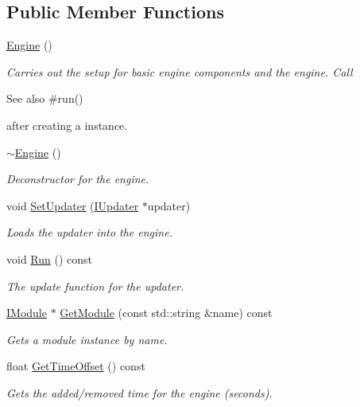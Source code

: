 \subsection*{Public Member Functions}
\begin{DoxyCompactItemize}
\item 
\hyperlink{class_flounder_1_1_engine_abd2648b60415ffaaae1152fa65e10937}{Engine} ()
\begin{DoxyCompactList}\small\item\em Carries out the setup for basic engine components and the engine. Call \begin{DoxySeeAlso}{See also}
\#run()


\end{DoxySeeAlso}
after creating a instance. \end{DoxyCompactList}\item 
\hyperlink{class_flounder_1_1_engine_abb8f83d5ed5345f6cb262a0ac5a3e24c}{$\sim$\+Engine} ()
\begin{DoxyCompactList}\small\item\em Deconstructor for the engine. \end{DoxyCompactList}\item 
void \hyperlink{class_flounder_1_1_engine_a6a756a97d38313bb3b8e0ef47a3767f8}{Set\+Updater} (\hyperlink{class_flounder_1_1_i_updater}{I\+Updater} $\ast$updater)
\begin{DoxyCompactList}\small\item\em Loads the updater into the engine. \end{DoxyCompactList}\item 
void \hyperlink{class_flounder_1_1_engine_afb64e3656bdacc87a776202545d5adbf}{Run} () const
\begin{DoxyCompactList}\small\item\em The update function for the updater. \end{DoxyCompactList}\item 
\hyperlink{class_flounder_1_1_i_module}{I\+Module} $\ast$ \hyperlink{class_flounder_1_1_engine_ae5e1252b6e36d544e411096f7c27c952}{Get\+Module} (const std\+::string \&name) const
\begin{DoxyCompactList}\small\item\em Gets a module instance by name. \end{DoxyCompactList}\item 
float \hyperlink{class_flounder_1_1_engine_a0602fd055a84457207c076ae3f221ffe}{Get\+Time\+Offset} () const
\begin{DoxyCompactList}\small\item\em Gets the added/removed time for the engine (seconds). \end{DoxyCompactList}\item 

\end{DoxyCompactItemize}
